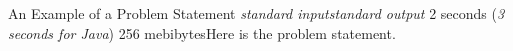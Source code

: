 \begin{problem}{An Example of a Problem Statement}
{\textsl{standard input}}{\textsl{standard output}}
{2 seconds (\textsl{3 seconds for Java})}
{256 mebibytes}Here is the problem statement.
\InputFile



\OutputFile


\Examples

\begin{example}
%
\end{example}

\begin{examplewide}
%
\end{examplewide}

\begin{examplethree}
%
\end{examplethree}


\end{problem}
